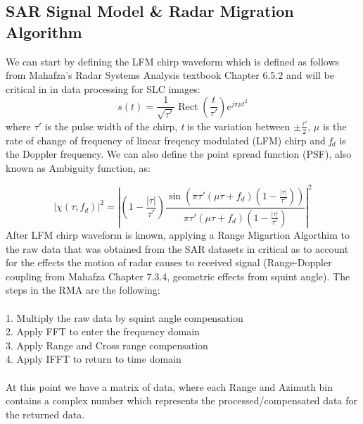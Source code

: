 \documentclass[conference]{IEEEtran}
\begin{document}
\subsection{SAR Signal Model \& Radar Migration Algorithm}
\par We can start by defining the LFM chirp waveform which is defined as follows from Mahafza's Radar Systems Analysis textbook Chapter 6.5.2\cite{mahafza} and will be critical in in data processing for SLC images:
\begin{equation}
    s(t) = \frac{1}{\sqrt{\tau'}} \operatorname{Rect} \left( \frac{t}{\tau'} \right) e^{j \pi \mu t^2}
\end{equation} 
where $\tau'$ is the pulse width of the chirp, \emph{t} is the variation between $\pm\frac{\tau'}{2}$, $\mu$ is the rate of change of frequency of linear freqency modulated (LFM) chirp and \emph{f$_d$} is the Doppler frequency. We can also define the point spread function (PSF), also known as Ambiguity function, as:

\begin{equation}
    |\chi(\tau; f_d)|^2 = \left| \left( 1 - \frac{|\tau|}{\tau'} \right) \frac{\sin \left( \pi \tau' (\mu \tau + f_d) \left( 1 - \frac{|\tau|}{\tau'} \right) \right)}{\pi \tau' (\mu \tau + f_d) \left( 1 - \frac{|\tau|}{\tau'} \right)} \right|^2
\end{equation}
After LFM chirp waveform is known, applying a Range Migartion Algorthim to the raw data that was obtained from the SAR datasets in critical as to account for the effects the motion of radar causes to received signal (Range-Doppler coupling from Mahafza Chapter 7.3.4\cite{mahafza}, geometric effects from squint angle). The steps in the RMA are the following:\\
\\
1. Multiply the raw data by squint angle compensation\\
2. Apply FFT to enter the frequency domain\\
3. Apply Range and Cross range compensation\\
4. Apply IFFT to return to time domain\\
\\
At this point we have a matrix of data, where each Range and Azimuth bin contains a complex number which represents the processed/compensated data for the returned data.
\end{document}

